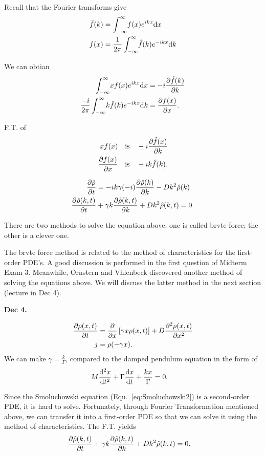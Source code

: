 
Recall that the Fourier transforms give
\begin{align}
\hat{f}(k) &= \int_{-\infty}^\infty\! f(x)e^{ikx} \mathrm{d}x\\
f(x) &= \frac{1}{2\pi} \int_{-\infty}^\infty\! \hat{f}(k)e^{-ikx} \mathrm{d}k
\end{align}

We can obtian
\begin{align}
\int_{-\infty}^\infty\! xf(x)e^{ikx} \mathrm{d}x &= -i \frac{\partial {\hat{f}(k)}}{\partial {k}}\\
\frac{-i}{2\pi} \int_{-\infty}^\infty\! k\hat{f}(k)e^{-ikx} \mathrm{d}k &= \frac{\partial {f(x)}}{\partial x}.
\end{align}

F.T. of 
\begin{align}
xf(x) \quad &\mathrm{is}\quad -i\frac{\partial {\hat{f}(x)}}{\partial {k}}\\
\frac{\partial {f(x)}}{\partial x} \quad &\mathrm{is}\quad -ik\hat{f}(k).
\end{align}

\begin{align}
\frac{\partial {\hat{\rho}}}{\partial t} &= -ik \gamma (-i)\frac{\partial {\hat{\rho}(k)}}{\partial {k}} -Dk^2 \hat{\rho} (k)\\
\frac{\partial {\hat{\rho}(k,t)}}{\partial t} &+ \gamma k \frac{\partial {\hat{\rho}(k,t)}}{\partial {k}} + Dk^2 \hat{\rho} (k,t) = 0.
\end{align}

There are two methods to solve the equation above: one is called brvte force; the other is a clever one. 

The brvte force method is related to the method of characteristics for the first-order PDE's. A good discussion is performed in the first question of Midterm Exam 3. Meanwhile, Ornstern and Vhlenbeck discovered another method of solving the equations above. We will discuss the latter method in the next section (lecture in Dec 4). 


\textbf{Dec 4.}

\begin{align}
\frac{\partial {\rho(x,t)}}{\partial t} &= \frac{\partial {}}{\partial x} \left[ \gamma x \rho(x,t)\right] + D \frac{\partial^2 {\rho(x,t)}}{\partial x^2}\\
j &= \rho (-\gamma x).\label{eq:Smoluchowski2}
\end{align}
We can make $ \gamma = \frac{k}{\Gamma} $, compared to the damped pendulum equation in the form of 
\begin{align}
M \frac{{\mathrm d}^2 {x}}{{\mathrm d}t^2} + \Gamma \frac{{\mathrm d} {x  }}{{\mathrm d}t} + \frac{kx}{\Gamma} &=0.
\end{align}

Since the Smoluchowski equation (Equ.~\eqref{eq:Smoluchowski2}) is a second-order PDE, it is hard to solve.  Fortunately, through Fourier Transformation mentioned above, we can transfer it into a first-order PDE so that we can solve it using the method of characteristics. The F.T. yields
\begin{align}
\frac{\partial {\hat{\rho}(k,t)}}{\partial t} + \gamma k \frac{\partial {\hat{\rho}(k,t)}}{\partial {k}} + D k^2 \hat{\rho} (k,t) &=0.
\end{align}


